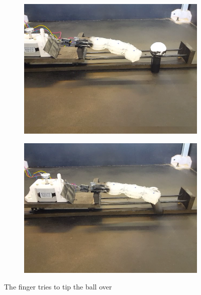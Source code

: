 \documentclass[letterpaper, 10 pt, conference]{ieeeconf}  %
\begin{document}
\begin{figure}[htpb]
\begin{subfigure}[b]{0.72in}
                \includegraphics[width=\textwidth]{figures/finger/finger8.png}
        \end{subfigure}
        \begin{subfigure}[b]{0.72in}                            
                \centering
                \includegraphics[width=\textwidth]{figures/finger/finger9.png}
        \end{subfigure}
        
        \caption{The finger tries to tip the ball over}
        \label{fig:fingerfun}
        \end{figure}
\blindtext[1]
\end{document}
